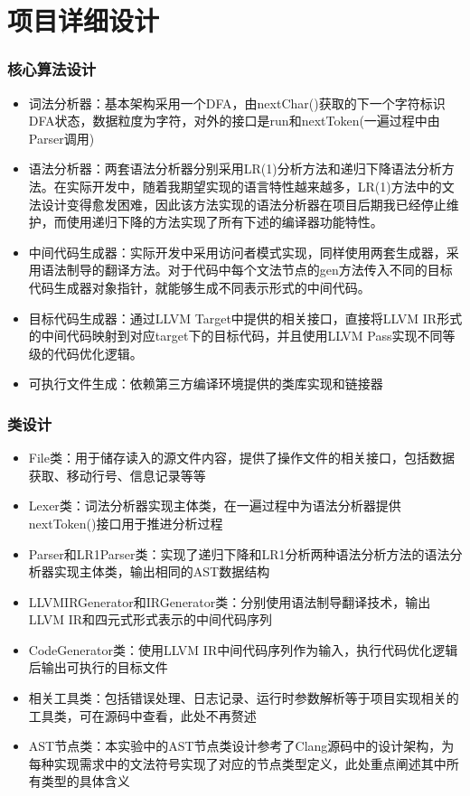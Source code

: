 \section{项目详细设计}
\begin{frame}
    \frametitle{核心算法设计}
    \footnotesize
    \begin{itemize}
        \item {词法分析器：基本架构采用一个DFA，由nextChar()获取的下一个字符标识DFA状态，数据粒度为字符，对外的接口是run和nextToken(一遍过程中由Parser调用)}
        \item {语法分析器：两套语法分析器分别采用LR(1)分析方法和递归下降语法分析方法。在实际开发中，随着我期望实现的语言特性越来越多，LR(1)方法中的文法设计变得愈发困难，因此该方法实现的语法分析器在项目后期我已经停止维护，而使用递归下降的方法实现了所有下述的编译器功能特性。}
        \item {中间代码生成器：实际开发中采用访问者模式实现，同样使用两套生成器，采用语法制导的翻译方法。对于代码中每个文法节点的gen方法传入不同的目标代码生成器对象指针，就能够生成不同表示形式的中间代码。}
        \item {目标代码生成器：通过LLVM Target中提供的相关接口，直接将LLVM IR形式的中间代码映射到对应target下的目标代码，并且使用LLVM Pass实现不同等级的代码优化逻辑。}
        \item {可执行文件生成：依赖第三方编译环境提供的类库实现和链接器}
    \end{itemize}
\end{frame}

\begin{frame}
    \frametitle{类设计}
    \footnotesize
    \begin{itemize}
        \item {File类：用于储存读入的源文件内容，提供了操作文件的相关接口，包括数据获取、移动行号、信息记录等等}
        \item {Lexer类：词法分析器实现主体类，在一遍过程中为语法分析器提供nextToken()接口用于推进分析过程}
        \item {Parser和LR1Parser类：实现了递归下降和LR1分析两种语法分析方法的语法分析器实现主体类，输出相同的AST数据结构}
        \item {LLVMIRGenerator和IRGenerator类：分别使用语法制导翻译技术，输出LLVM IR和四元式形式表示的中间代码序列}
        \item {CodeGenerator类：使用LLVM IR中间代码序列作为输入，执行代码优化逻辑后输出可执行的目标文件}
        \item {相关工具类：包括错误处理、日志记录、运行时参数解析等于项目实现相关的工具类，可在源码中查看，此处不再赘述}
        \item {AST节点类：本实验中的AST节点类设计参考了Clang源码中的设计架构，为每种实现需求中的文法符号实现了对应的节点类型定义，此处重点阐述其中所有类型的具体含义}
    \end{itemize}
\end{frame}

